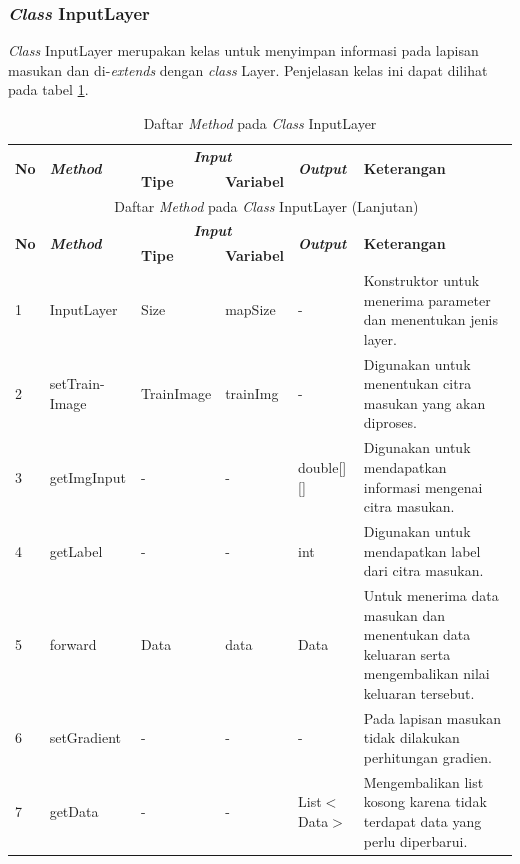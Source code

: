 \subsubsection{\textit{Class} InputLayer}
\noindent \textit{Class} InputLayer merupakan kelas untuk menyimpan informasi pada lapisan masukan dan di-\textit{extends} dengan \textit{class} Layer. Penjelasan kelas ini dapat dilihat pada tabel \ref{tbl:classInputLayer}.
\begingroup
\setlength{\LTleft}{-20cm plus -1fill}
\setlength{\LTright}{\LTleft}
\begin{small}
\begin{longtable}{|p{0.4cm}|p{2cm}|p{1.8cm}|p{1.8cm}|p{1.7cm}|p{3.55cm}|}
	\caption{Daftar \textit{Method} pada \textit{Class} InputLayer \label{tbl:classInputLayer}}\\
	\hline
	\multirow{2}{*}{\textbf{No}} & \multirow{2}{*}{\textit{\textbf{Method}}} & \multicolumn{2}{c|}{\textit{\textbf{Input}}} & \multirow{2}{*}{\textit{\textbf{Output}}} & 
	\multirow{2}{*}{\textbf{Keterangan}}\\
	\cline{3-4}
	& & \textbf{Tipe} & \textbf{Variabel} & & \\
	\endfirsthead
	\multicolumn{6}{c}{\textbf{\tablename~\thetable} Daftar \textit{Method} pada \textit{Class} InputLayer (Lanjutan)} \\
	\hline
	\multirow{2}{*}{\textbf{No}} & \multirow{2}{*}{\textit{\textbf{Method}}} & \multicolumn{2}{c|}{\textit{\textbf{Input}}} & \multirow{2}{*}{\textit{\textbf{Output}}} & 
	\multirow{2}{*}{\textbf{Keterangan}}\\
	\cline{3-4}
	& & \textbf{Tipe} & \textbf{Variabel} & & \\
	\endhead
	\hline
	1 & InputLayer & Size & mapSize & - & Konstruktor untuk menerima parameter dan menentukan jenis layer.\\
	\hline
	2 & setTrain-\newline Image & TrainImage & trainImg & - & Digunakan untuk menentukan citra masukan yang akan diproses.\\
	\hline
	3 & getImgInput & - & - & double[][] & Digunakan untuk mendapatkan informasi mengenai citra masukan.\\
	\hline
	4 & getLabel & - & - & int & Digunakan untuk mendapatkan label dari citra masukan.\\
	\hline
	5 & forward & Data & data & Data & Untuk menerima data masukan dan menentukan data keluaran serta mengembalikan nilai keluaran tersebut.\\
	\hline
	6 & setGradient & - & - & - & Pada lapisan masukan tidak dilakukan perhitungan gradien.\\
	\hline
	7 & getData & - & - & List$<$Data$>$ & Mengembalikan list kosong karena tidak terdapat data yang perlu diperbarui.\\
	\hline
\end{longtable}
\end{small}
\endgroup

